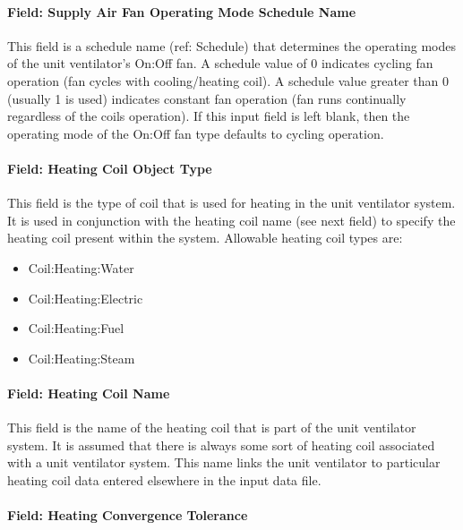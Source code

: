 \paragraph{Field: Supply Air Fan Operating Mode Schedule Name}\label{field-supply-air-fan-operating-mode-schedule-name-1-000}

This field is a schedule name (ref: Schedule) that determines the operating modes of the unit ventilator's On:Off fan. A schedule value of 0 indicates cycling fan operation (fan cycles with cooling/heating coil). A schedule value greater than 0 (usually 1 is used) indicates constant fan operation (fan runs continually regardless of the coils operation). If this input field is left blank, then the operating mode of the On:Off fan type defaults to cycling operation.

\paragraph{Field: Heating Coil Object Type}\label{field-heating-coil-object-type-1-001}

This field is the type of coil that is used for heating in the unit ventilator system. It is used in conjunction with the heating coil name (see next field) to specify the heating coil present within the system. Allowable heating coil types are:

\begin{itemize}
\item
  Coil:Heating:Water
\item
  Coil:Heating:Electric
\item
  Coil:Heating:Fuel
\item
  Coil:Heating:Steam
\end{itemize}

\paragraph{Field: Heating Coil Name}\label{field-heating-coil-name-1-001}

This field is the name of the heating coil that is part of the unit ventilator system. It is assumed that there is always some sort of heating coil associated with a unit ventilator system. This name links the unit ventilator to particular heating coil data entered elsewhere in the input data file.

\paragraph{Field: Heating Convergence Tolerance}\label{field-heating-convergence-tolerance-1}

